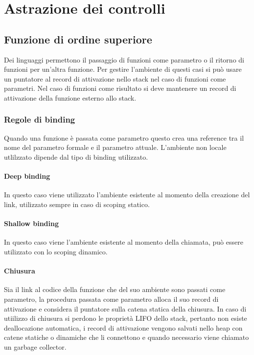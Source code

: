 \chapter{Astrazione dei controlli}
\section{Funzione di ordine superiore}
Dei linguaggi permettono il passaggio di funzioni come parametro o il ritorno di funzioni per un'altra funzione. Per gestire l'ambiente di questi casi si pu\`o usare un 
puntatore al record di attivazione nello stack nel caso di funzioni come parametri. Nel caso di funzioni come risultato si deve mantenere un record di attivazione della funzione
esterno allo stack. 
\subsection{Regole di binding}
Quando una funzione \`e passata come parametro questo crea una reference tra il nome del parametro formale e il parametro attuale. L'ambiente non locale utlilzzato dipende 
dal tipo di binding utilizzato.
\subsubsection{Deep binding}
In questo caso viene utilizzato l'ambiente esistente al momento della creazione del link, utilizzato sempre in caso di scoping statico.
\subsubsection{Shallow binding}
In questo caso viene l'ambiente esistente al momento della chiamata, pu\`o essere utilizzato con lo scoping dinamico. 
\subsubsection{Chiusura}
Sia il link al codice della funzione che del suo ambiente sono passati come parametro, la procedura passata come parametro alloca il suo record di attivazione e considera
il puntatore sulla catena statica della chiusura. In caso di utiilizzo di chiusura si perdono le propriet\`a LIFO dello stack, pertanto non esiste deallocazione automatica, 
i record di attivazione vengono salvati nello heap con catene statiche o dinamiche che li connettono e quando necessario viene chiamato un garbage collector. 
